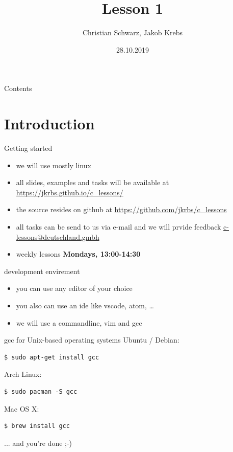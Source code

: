 \documentclass[10pt,graphics,aspectratio=169,table]{beamer}
\title{Lesson 1}
\author{Christian Schwarz, Jakob Krebs}
\date{28.10.2019}
\begin{document}
\maketitle

\begin{frame}{Contents}
	\tableofcontents
\end{frame}

\section{Introduction}
\begin{frame}{Getting started}
  \begin{itemize}
  \item we will use mostly linux
  \item all slides, examples and tasks will be available at
    \url{https://jkrbs.github.io/c_lessons/}
  \item the source resides on github at
    \url{https://github.com/jkrbs/c_lessons}
  \item all tasks can be send to us via e-mail and we will prvide feedback
    \url{c-lessons@deutschland.gmbh}
  \item weekly lessons \textbf{Mondays, 13:00-14:30}
  \end{itemize}
\end{frame}

\begin{frame}{development envirement}
  \begin{itemize}
  \item you can use any editor of your choice
  \item you also can use an ide like vscode, atom, \ldots
  \item we will use a commandline, vim and gcc
  \end{itemize}
\end{frame}


\begin{frame}[fragile]{gcc for Unix-based operating systems}
	Ubuntu / Debian:
	\begin{lstlisting}[numbers=none]
$ sudo apt-get install gcc
\end{lstlisting}
	\bigskip
	Arch Linux:
	\begin{lstlisting}[numbers=none]
$ sudo pacman -S gcc
\end{lstlisting}
	\bigskip
	Mac OS X:
	\begin{lstlisting}[numbers=none]
$ brew install gcc
\end{lstlisting}
	\bigskip
	... and you're done ;-)
\end{frame}
\end{document}
